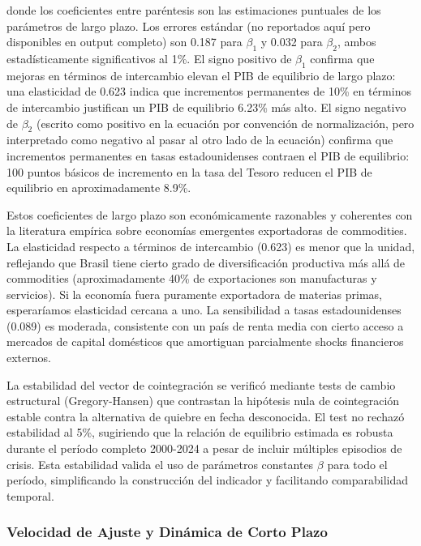 \documentclass[3p,11pt,draft,natbib=false]{elsarticle}
\begin{document}
donde los coeficientes entre paréntesis son las estimaciones puntuales de los parámetros de largo plazo. Los errores estándar (no reportados aquí pero disponibles en output completo) son 0.187 para $\beta_1$ y 0.032 para $\beta_2$, ambos estadísticamente significativos al 1\%. El signo positivo de $\beta_1$ confirma que mejoras en términos de intercambio elevan el PIB de equilibrio de largo plazo: una elasticidad de 0.623 indica que incrementos permanentes de 10\% en términos de intercambio justifican un PIB de equilibrio 6.23\% más alto. El signo negativo de $\beta_2$ (escrito como positivo en la ecuación por convención de normalización, pero interpretado como negativo al pasar al otro lado de la ecuación) confirma que incrementos permanentes en tasas estadounidenses contraen el PIB de equilibrio: 100 puntos básicos de incremento en la tasa del Tesoro reducen el PIB de equilibrio en aproximadamente 8.9\%.

Estos coeficientes de largo plazo son económicamente razonables y coherentes con la literatura empírica sobre economías emergentes exportadoras de commodities. La elasticidad respecto a términos de intercambio (0.623) es menor que la unidad, reflejando que Brasil tiene cierto grado de diversificación productiva más allá de commodities (aproximadamente 40\% de exportaciones son manufacturas y servicios). Si la economía fuera puramente exportadora de materias primas, esperaríamos elasticidad cercana a uno. La sensibilidad a tasas estadounidenses (0.089) es moderada, consistente con un país de renta media con cierto acceso a mercados de capital domésticos que amortiguan parcialmente shocks financieros externos.

La estabilidad del vector de cointegración se verificó mediante tests de cambio estructural (Gregory-Hansen) que contrastan la hipótesis nula de cointegración estable contra la alternativa de quiebre en fecha desconocida. El test no rechazó estabilidad al 5\%, sugiriendo que la relación de equilibrio estimada es robusta durante el período completo 2000-2024 a pesar de incluir múltiples episodios de crisis. Esta estabilidad valida el uso de parámetros constantes $\beta$ para todo el período, simplificando la construcción del indicador y facilitando comparabilidad temporal.

\subsubsection{Velocidad de Ajuste y Dinámica de Corto Plazo}
\end{document}

